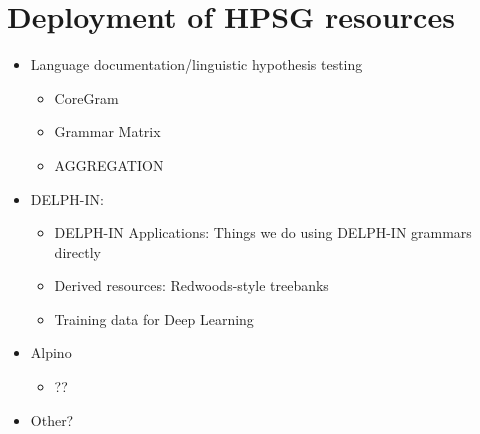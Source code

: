 \documentclass[output=paper]{langsci/langscibook}
\begin{document}







\section{Deployment of HPSG resources}
\label{sec:deployment}


\begin{itemize}
 \item Language documentation/linguistic hypothesis testing
    \begin{itemize}
    \item CoreGram %
    \item Grammar Matrix %
    \item AGGREGATION %
    \end{itemize}
 \item DELPH-IN:
    \begin{itemize}
    \item DELPH-IN Applications: Things we do using DELPH-IN grammars directly %
    \item Derived resources: Redwoods-style treebanks %
    \item Training data for Deep Learning %
    \end{itemize}
 \item Alpino %
    \begin{itemize}
    \item ??
    \end{itemize}
 \item Other?
 \end{itemize}
\end{document}
